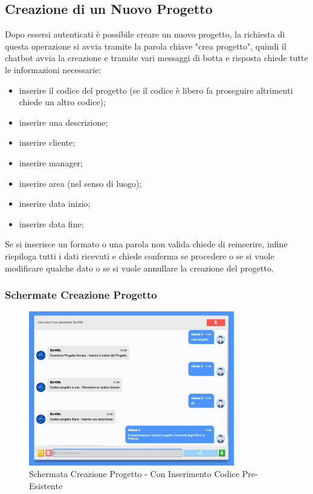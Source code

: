 \subsection{Creazione di un Nuovo Progetto}
Dopo essersi autenticati è possibile creare un nuovo progetto, la richiesta di questa operazione si avvia tramite la parola chiave "crea progetto", quindi il chatbot avvia la creazione e tramite vari messaggi di botta e risposta chiede tutte le informazioni necessarie:
\begin{itemize}
    \item inserire il codice del progetto (se il codice è libero fa proseguire altrimenti chiede un altro codice);
    \item inserire una descrizione;
    \item inserire cliente;
    \item inserire manager;
    \item inserire area (nel senso di luogo);
    \item inserire data inizio;
    \item inserire data fine;
\end{itemize}
Se si inserisce un formato o una parola non valida chiede di reinserire, infine riepiloga tutti i dati ricevuti e chiede conferma se procedere o se si vuole modificare qualche dato o se si vuole annullare la creazione del progetto.

\subsubsection{Schermate Creazione Progetto}
\begin{figure}[H]
    \centering\includegraphics[width=0.8\textwidth, height=0.7\textheight, keepaspectratio]{images/schermata_creazione_progetto_1.png}
    \caption{Schermata Creazione Progetto - Con Inserimento Codice Pre-Esistente}
\end{figure}

